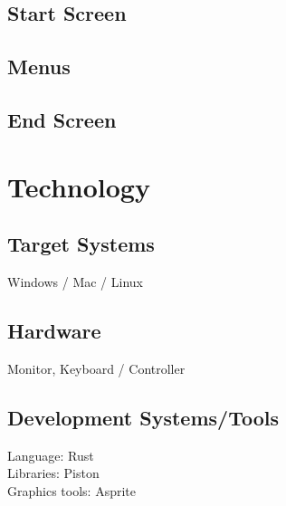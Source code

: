 \documentclass[a4paper]{scrreprt}
\begin{document}
\section{Start Screen}

\section{Menus}

\section{End Screen}




\chapter{Technology}

\section{Target Systems}
Windows / Mac / Linux

\section{Hardware}
Monitor, Keyboard / Controller

\section{Development Systems/Tools}
Language: Rust\\
Libraries: Piston\\
Graphics tools: Asprite
\end{document}
